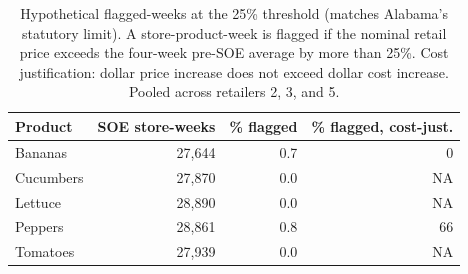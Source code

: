 \begin{table}[!h]
\centering
\caption{\label{tab:tab:flagged_weeks_T25}Hypothetical flagged-weeks at the 25\% threshold (matches Alabama's statutory limit). A store-product-week is flagged if the nominal retail price exceeds the four-week pre-SOE average by more than 25\%. Cost justification: dollar price increase does not exceed dollar cost increase. Pooled across retailers 2, 3, and 5.}
\centering
\begin{tabular}[t]{lrrr}
\toprule
Product & SOE store-weeks & \% flagged & \% flagged, cost-just.\\
\midrule
Bananas & 27,644 & 0.7 & 0\\
Cucumbers & 27,870 & 0.0 & NA\\
Lettuce & 28,890 & 0.0 & NA\\
Peppers & 28,861 & 0.8 & 66\\
Tomatoes & 27,939 & 0.0 & NA\\
\bottomrule
\end{tabular}
\end{table}
